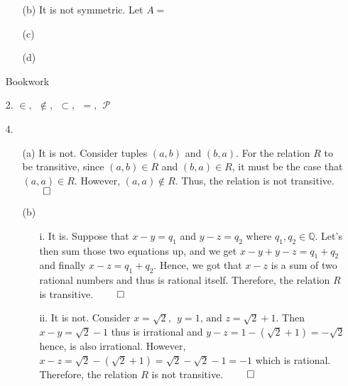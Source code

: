 \documentclass[12pt, a4paper]{article}
\newcommand{\rats}{\mathbb{Q}}
\newcommand\und[1]{\underline{\smash{#1}}}
\begin{document}
\begin{itemize}
\begin{itemize}
\item[(b)]
It is not symmetric. Let $A = $
\item[]

\item[(c)]

\item[]

\item[(d)]
\end{itemize}

\newpage

{\Large Bookwork}
\item[]
\item[]

{\Large \textbf{\und{4.2}}}

\item[]

\item[2.]
$\in, \ \ \notin, \ \ \subset, \ \ =, \ \ \mathcal{P}$

\item[]
\item[]

\item[4.]
\begin{itemize}
\item[(a)]
It is not. Consider tuples $(a, b)$ and $(b, a)$. For the relation $R$
to be transitive, since $(a, b) \in R$ and $(b, a) \in R$, it must be the
case that $(a, a) \in R$. However, $(a, a) \notin R$. Thus, the relation is not transitive.
$\qed$

\item[]

\item[(b)]
\begin{itemize}
\item[i.]
It is. Suppose that $x - y = q_1$ and $y - z = q_2$ where $q_1, q_2 \in \rats$.
Let's then sum those two equations up, and we get $x - y + y - z = q_1 + q_ 2$
and finally $x - z = q_1 + q_2$. Hence, we got that $x - z$ is a sum of two rational
numbers and thus is rational itself. Therefore, the relation $R$ is transitive.
$\qed$

\item[]

\item[ii.]
It is not. Consider $x = \sqrt{2}, \ \ y = 1 \mbox{, and } z = \sqrt{2} + 1$.
Then $x - y = \sqrt{2} - 1$ thus is irrational and $y - z = 1 - (\sqrt{2} + 1) = -\sqrt{2}$
hence, is also irrational. However, $x - z = \sqrt{2} - (\sqrt{2} + 1) = \sqrt{2} - \sqrt{2} - 1 = -1$
which is rational. Therefore, the relation $R$ is not transitive.
$\qed$


\end{itemize}
\end{itemize}
\end{itemize}
\end{document}
